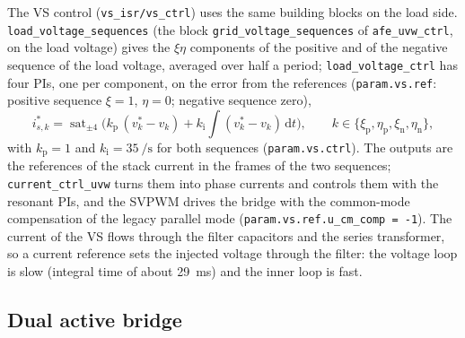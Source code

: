 \documentclass[11pt,a4paper]{scrartcl}
\newcommand{\ped}[1]{_{\mathrm{#1}}}
\newcommand{\code}[1]{\texttt{#1}}
\begin{document}
\begin{onehalfspace}
The VS control (\code{vs\_isr/vs\_ctrl}) uses the same building blocks on the load side. \code{load\_voltage\_sequences} (the block \code{grid\_voltage\_sequences} of \code{afe\_uvw\_ctrl}, on the load voltage) gives the $\xi\eta$ components of the positive and of the negative sequence of the load voltage, averaged over half a period; \code{load\_voltage\_ctrl} has four PIs, one per component, on the error from the references (\code{param.vs.ref}: positive sequence $\xi = 1$, $\eta = 0$; negative sequence zero),
\begin{equation}
	i^*_{s,k} = \operatorname{sat}_{\pm 4}\!\Big(k\ped{p}\,(v^*_k - v_k) + k\ped{i}\!\int (v^*_k - v_k)\,\mathrm{d}t\Big), \qquad k \in \{\xi\ped{p}, \eta\ped{p}, \xi\ped{n}, \eta\ped{n}\},
	\label{eq:vsctrl}
\end{equation}
with $k\ped{p} = 1$ and $k\ped{i} = \SI{35}{\per\second}$ for both sequences (\code{param.vs.ctrl}). The outputs are the references of the stack current in the frames of the two sequences; \code{current\_ctrl\_uvw} turns them into phase currents and controls them with the resonant PIs, and the SVPWM drives the bridge with the common-mode compensation of the legacy parallel mode (\code{param.vs.ref.u\_cm\_comp = -1}). The current of the VS flows through the filter capacitors and the series transformer, so a current reference sets the injected voltage through the filter: the voltage loop is slow (integral time of about \SI{29}{ms}) and the inner loop is fast.

\subsection{Dual active bridge}
\label{sec:dab}


\end{onehalfspace}
\end{document}
